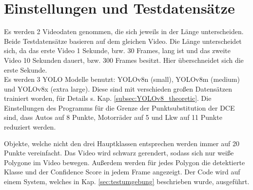 \section{Einstellungen und Testdatensätze}
{
	Es werden 2 Videodaten genommen, die sich jeweils in der Länge unterscheiden. Beide Testdatensätze basieren auf dem gleichen Video. Die Länge unterscheidet sich, da das erste Video 1 Sekunde, bzw. 30 Frames, lang ist und das zweite Video 10 Sekunden dauert, bzw. 300 Frames besitzt. Hier überschneidet sich die erste Sekunde. \\
	Es werden 3 YOLO Modelle benutzt: YOLOv8n (small), YOLOv8m (medium) und YOLOv8x (extra large). Diese sind mit verschieden großen Datensätzen trainiert worden, für Details s. Kap. \ref{subsec:YOLOv8_theoretic}.
	Die Einstellungen des Programms für die Grenze der Punktsubstitution der DCE sind, dass Autos auf 8 Punkte, Motorräder auf 5 und Lkw auf 11 Punkte reduziert werden.

	Objekte, welche nicht den drei Hauptklassen entsprechen werden immer auf 20 Punkte vereinfacht. Das Video wird  schwarz gerendert, sodass sich nur weiße Polygone im Video bewegen. Außerdem werden für jedes Polygon die detektierte Klasse und der Confidence Score in jedem Frame angezeigt.
	Der Code wird auf einem System, welches in Kap. \ref{sec:testumgebung} beschrieben wurde, ausgeführt.

}
